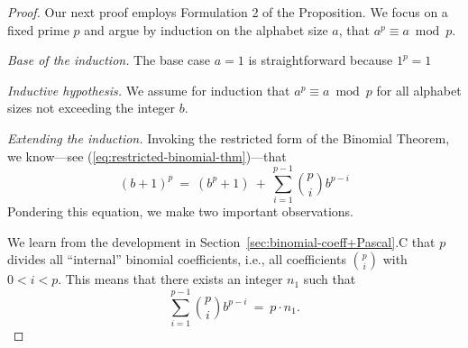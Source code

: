 \begin{proof}
Our next proof employs Formulation 2 of the Proposition.  We focus on
a fixed prime $p$ and argue by induction on the alphabet size $a$,
that $a^{p} \equiv a \bmod p$.

\noindent
{\it Base of the induction.}
The base case $a=1$ is straightforward because $1^{p} = 1$

\noindent
{\it Inductive hypothesis.}
We assume for induction that $a^{p} \equiv a \bmod p$ for all alphabet
sizes not exceeding the integer $b$.

\noindent
{\it Extending the induction.}
Invoking the restricted form of the Binomial Theorem,
we know---see (\ref{eq:restricted-binomial-thm})---that
\begin{equation}
\label{eq:FLT-0}
(b+1)^p \ = \ \left( b^p + 1 \right) \ + \
 \sum_{i=1}^{p-1} {p \choose i} b^{p-i}
\end{equation}
Pondering this equation, we make two important observations.

We learn from the development in
Section~\ref{sec:binomial-coeff+Pascal}.C that $p$ divides all
``internal'' binomial coefficients, i.e., all coefficients
$\displaystyle {p \choose i}$ with $0 < i < p$.  This means that there
exists an integer $n_1$ such that
\begin{equation}
\label{eq:FLT-1}
 \sum_{i=1}^{p-1} {p \choose i} b^{p-i} \ = \ p \cdot n_1.
\end{equation}


\end{proof}
